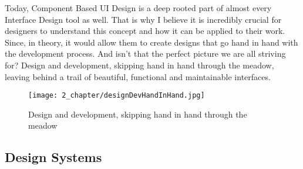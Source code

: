 Today, Component Based UI Design is a deep rooted part of almost every Interface Design tool as
well. That is why I believe it is incredibly crucial for designers to understand this concept and
how it can be applied to their work. Since, in theory, it would allow them to create designs that go
hand in hand with the development process. And isn't that the perfect picture we are all striving
for? Design and development, skipping hand in hand through the meadow, leaving behind a trail of
beautiful, functional and maintainable interfaces.

\begin{figure}[h!]
    \begin{center}
        \texttt{[image: 2\_chapter/designDevHandInHand.jpg]}
        \caption[Caption (url)]{Design and development, skipping hand in hand through the meadow}
    \end{center}
\end{figure}


\subsection{Design Systems}
